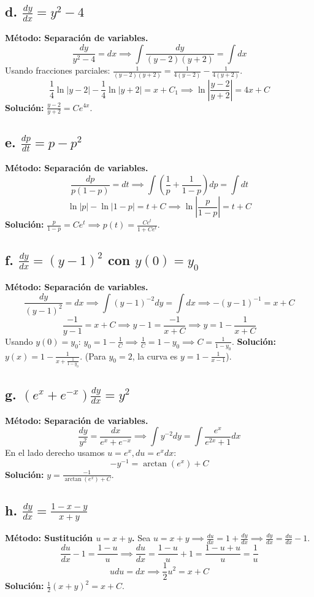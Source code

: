 \documentclass[a4paper]{article}
\begin{document}
\subsection*{d. $\frac{dy}{dx} = y^2 - 4$}
\textbf{Método: Separación de variables.}
$$\frac{dy}{y^2 - 4} = dx \implies \int \frac{dy}{(y-2)(y+2)} = \int dx$$
Usando fracciones parciales: $\frac{1}{(y-2)(y+2)} = \frac{1}{4(y-2)} - \frac{1}{4(y+2)}$.
$$\frac{1}{4} \ln|y-2| - \frac{1}{4} \ln|y+2| = x + C_1 \implies \ln\left| \frac{y-2}{y+2} \right| = 4x + C$$
\textbf{Solución:} $\frac{y-2}{y+2} = Ce^{4x}$.

\subsection*{e. $\frac{dp}{dt} = p - p^2$}
\textbf{Método: Separación de variables.}
$$\frac{dp}{p(1-p)} = dt \implies \int \left( \frac{1}{p} + \frac{1}{1-p} \right) dp = \int dt$$
$$\ln|p| - \ln|1-p| = t + C \implies \ln\left| \frac{p}{1-p} \right| = t + C$$
\textbf{Solución:} $\frac{p}{1-p} = Ce^t \implies p(t) = \frac{Ce^t}{1 + Ce^t}$.

\subsection*{f. $\frac{dy}{dx} = (y - 1)^2$ con $y(0) = y_0$}
\textbf{Método: Separación de variables.}
$$\frac{dy}{(y-1)^2} = dx \implies \int (y-1)^{-2} dy = \int dx \implies -(y-1)^{-1} = x + C$$
$$\frac{-1}{y-1} = x + C \implies y - 1 = \frac{-1}{x+C} \implies y = 1 - \frac{1}{x+C}$$
Usando $y(0) = y_0$: $y_0 = 1 - \frac{1}{C} \implies \frac{1}{C} = 1 - y_0 \implies C = \frac{1}{1 - y_0}$.
\textbf{Solución:} $y(x) = 1 - \frac{1}{x + \frac{1}{1-y_0}}$. (Para $y_0=2$, la curva es $y = 1 - \frac{1}{x-1}$).

\subsection*{g. $(e^x + e^{-x}) \frac{dy}{dx} = y^2$}
\textbf{Método: Separación de variables.}
$$\frac{dy}{y^2} = \frac{dx}{e^x + e^{-x}} \implies \int y^{-2} dy = \int \frac{e^x}{e^{2x} + 1} dx$$
En el lado derecho usamos $u = e^x, du = e^x dx$:
$$-y^{-1} = \arctan(e^x) + C$$
\textbf{Solución:} $y = \frac{-1}{\arctan(e^x) + C}$.

\subsection*{h. $\frac{dy}{dx} = \frac{1-x-y}{x+y}$}
\textbf{Método: Sustitución $u = x+y$.}
Sea $u = x+y \implies \frac{du}{dx} = 1 + \frac{dy}{dx} \implies \frac{dy}{dx} = \frac{du}{dx} - 1$.
$$\frac{du}{dx} - 1 = \frac{1-u}{u} \implies \frac{du}{dx} = \frac{1-u}{u} + 1 = \frac{1-u+u}{u} = \frac{1}{u}$$
$$u du = dx \implies \frac{1}{2}u^2 = x + C$$
\textbf{Solución:} $\frac{1}{2}(x+y)^2 = x + C$.
\end{document}
